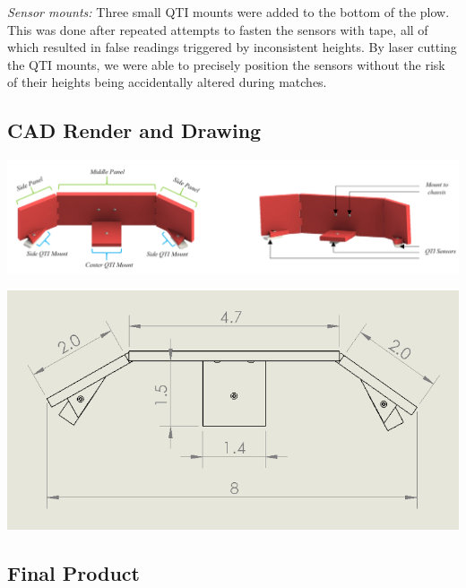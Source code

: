 \documentclass[11.5pt]{article}
\begin{document}
\noindent
\textit{Sensor mounts:}    Three small QTI mounts were added to the bottom of the plow. This was done after repeated attempts to fasten the sensors with tape, all of which resulted in false readings triggered by inconsistent heights. By laser cutting the QTI mounts, we were able to precisely position the sensors without the risk of their heights being accidentally altered during matches. 


\subsection{CAD Render and Drawing}

\begin{center}
\includegraphics[scale=1.8]{Images/CADrenders}
\end{center}

\begin{center}
\includegraphics[scale=0.4]{Images/CADdrawing}
\end{center}


\subsection{Final Product}
\end{document}
